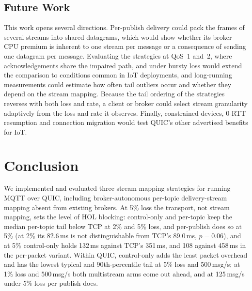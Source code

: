 \documentclass[a4paper,fleqn]{cas-dc}
\begin{document}
\subsection{Future Work}

This work opens several directions. Per-publish delivery could pack the frames of several streams into shared datagrams, which would show whether its broker CPU premium is inherent to one stream per message or a consequence of sending one datagram per message. Evaluating the strategies at QoS~1 and~2, where acknowledgements share the impaired path, and under bursty loss would extend the comparison to conditions common in IoT deployments, and long-running measurements could estimate how often tail outliers occur and whether they depend on the stream mapping. Because the tail ordering of the strategies reverses with both loss and rate, a client or broker could select stream granularity adaptively from the loss and rate it observes. Finally, constrained devices, 0-RTT resumption and connection migration would test QUIC's other advertised benefits for IoT.


\section{Conclusion}
\label{sec:conclusion}

We implemented and evaluated three stream mapping strategies for running MQTT over QUIC, including broker-autonomous per-topic delivery-stream mapping absent from existing brokers. At 5\% loss the transport, not stream mapping, sets the level of HOL blocking: control-only and per-topic keep the median per-topic tail below TCP at 2\% and 5\% loss, and per-publish does so at 5\% (at 2\% its 82.6\,ms is not distinguishable from TCP's 89.0\,ms, $p=0.06$), and at 5\% control-only holds 132\,ms against TCP's 351\,ms, and 108 against 458\,ms in the per-packet variant. Within QUIC, control-only adds the least packet overhead and has the lowest typical and 90th-percentile tail at 5\% loss and 500\,msg/s; at 1\% loss and 500\,msg/s both multistream arms come out ahead, and at 125\,msg/s under 5\% loss per-publish does.
\end{document}
